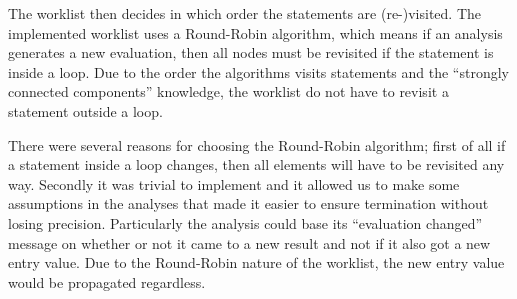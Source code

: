   The worklist then decides in which order the statements are (re-)visited.
The implemented worklist uses a Round-Robin algorithm, which means if an analysis
generates a new evaluation, then all nodes must be revisited if the statement is
inside a loop. Due to the order the algorithms visits statements and the
``strongly connected components'' knowledge, the worklist do not have to revisit
a statement outside a loop.

  There were several reasons for choosing the Round-Robin algorithm; first of all
if a statement inside a loop changes, then all elements will have to be revisited
any way. Secondly it was trivial to implement and it allowed us to make some
assumptions in the analyses that made it easier to ensure termination without
losing precision. Particularly the analysis could base its ``evaluation changed''
message on whether or not it came to a new result and not if it also got a new
entry value. Due to the Round-Robin nature of the worklist, the new entry value
would be propagated regardless.

